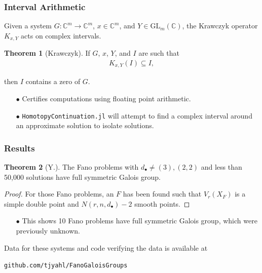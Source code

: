 \documentclass{beamer}
\theoremstyle{definition}
\newtheorem{thm}{Theorem}
\begin{document}
\begin{frame}
\frametitle{Interval Arithmetic}
Given a system $G:\mathbb{C}^m\to\mathbb{C}^m$, $x\in\mathbb{C}^m$, and $Y\in\text{GL}_m(\mathbb{C})$, the Krawczyk operator $K_{x,Y}$ acts on complex intervals.

\begin{thm}[Krawczyk]
\vspace{-.1cm}
If $G$, $x$, $Y$, and $I$ are such that 
\vspace{-.3cm}
\begin{align*}
K_{x,Y}(I)\subseteq I,
\end{align*}
\vspace{-.85cm} 

then $I$ contains a zero of $G$.
\end{thm}

\begin{enumerate}
\item[$\bullet$] Certifies computations using floating point arithmetic.

\item[$\bullet$] \texttt{HomotopyContinuation.jl} will attempt to find a complex interval around an approximate solution to isolate solutions.
\end{enumerate}
\end{frame}



\begin{frame}
\frametitle{Results}
\begin{thm}[Y.]
\vspace{.01cm}
The Fano problems with $d_\bullet\ne (3),(2,2)$ and less than 50,000 solutions have full symmetric Galois group.
\end{thm}
\begin{proof}
For those Fano problems, an $F$ has been found such that $V_r(X_F)$ is a simple double point and $N(r,n,d_\bullet)-2$ smooth points.
\end{proof}

\begin{enumerate}
\item[$\bullet$] This shows 10 Fano problems have full symmetric Galois group, which were previously unknown.
\end{enumerate}

Data for these systems and code verifying the data is available at 
\vspace{-.25cm}
\begin{center}
\texttt{github.com/tjyahl/FanoGaloisGroups}
\end{center}
\end{frame}
\end{document}
